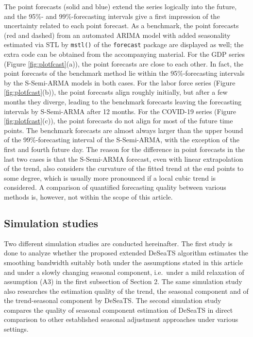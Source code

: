 \begin{verbatim}
\end{verbatim}

\noindent
The point forecasts (solid and blue) extend the series logically into the future, and the 95\%- and 99\%-forecasting intervals give a first impression of the uncertainty related to each point forecast. As a benchmark, the point forecasts (red and dashed) from an automated ARIMA model with added seasonality estimated via STL by \texttt{mstl()} of the \texttt{forecast} package are displayed as well; the extra code can be obtained from the accompanying material. For the GDP series (Figure \ref{fig:plotfcast}(a)), the point forecasts are close to each other. In fact, the point forecasts of the benchmark method lie within the 95\%-forecasting intervals by the S-Semi-ARMA models in both cases. For the labor force series (Figure \ref{fig:plotfcast}(b)), the point forecasts align roughly initially, but after a few months they diverge, leading to the benchmark forecasts leaving the forecasting intervals by S-Semi-ARMA after 12 months. For the COVID-19 series (Figure \ref{fig:plotfcast}(c)), the point forecasts do not align for most of the future time points. The benchmark forecasts are almost always larger than the upper bound of the 99\%-forecasting interval of the S-Semi-ARMA, with the exception of the first and fourth future day. The reason for the difference in point forecasts in the last two cases is that the S-Semi-ARMA forecast, even with linear extrapolation of the trend, also considers the curvature of the fitted trend at the end points to some degree, which is usually more pronounced if a local cubic trend is considered. A comparison of quantified forecasting quality between various methods is, however, not within the scope of this article.

\subsection{Simulation studies}\label{sec:simstudy}

Two different simulation studies are conducted hereinafter. The first study is done to analyze whether the proposed extended DeSeaTS algorithm estimates the smoothing bandwidth suitably both under the assumptions stated in this article and under a slowly changing seasonal component, i.e.~under a mild relaxation of assumption (A3) in the first subsection of Section 2. The same simulation study also researches the estimation quality of the trend, the seasonal component and of the trend-seasonal component by DeSeaTS. The second simulation study compares the quality of seasonal component estimation of DeSeaTS in direct comparison to other established seasonal adjustment approaches under various settings.


